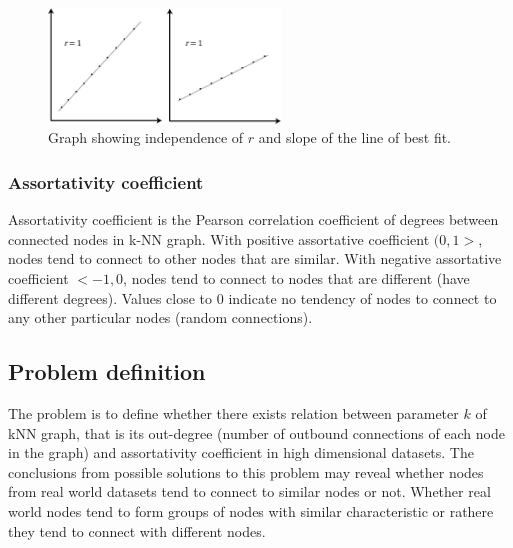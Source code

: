 \begin{figure}[h!]
  \centering
  \captionsetup{width=24pc, justification=centering}
    \includegraphics[width=0.55\textwidth]{images/pearson_graphs_slope.png}
  \caption{Graph showing independence of $r$ and slope of the line of best fit.}
  \label{fig:pearson_graph_slope}
\end{figure}

\subsubsection{Assortativity coefficient}
Assortativity coefficient is the Pearson correlation coefficient of degrees between connected nodes in k-NN graph.
With positive assortative coefficient $(0, 1>$, nodes tend to connect to other nodes that are similar.
With negative assortative coefficient $<-1, 0$, nodes tend to connect to nodes that are different (have different degrees).
Values close to $0$ indicate no tendency of nodes to connect to any other particular nodes (random connections).

\subsection{Problem definition}
The problem is to define whether there exists relation between parameter $k$ of kNN graph, that is its out-degree (number of outbound connections of each node in the graph) and assortativity coefficient in high dimensional datasets.
The conclusions from possible solutions to this problem may reveal whether nodes from real world datasets tend to connect to similar nodes or not.
Whether real world nodes tend to form groups of nodes with similar characteristic or rathere they tend to connect with different nodes.